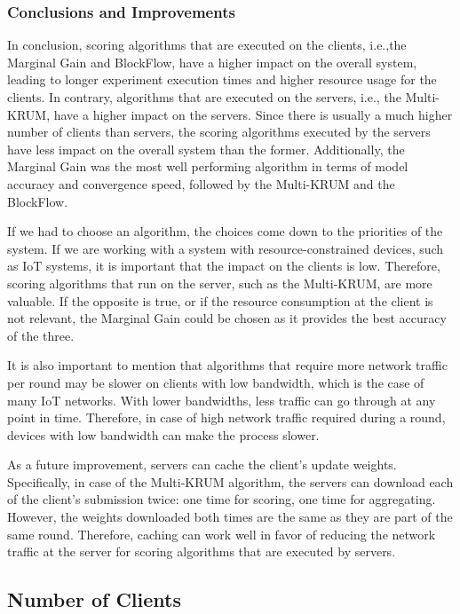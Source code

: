 \subsubsection{Conclusions and Improvements}

In conclusion, scoring algorithms that are executed on the clients, i.e.,the Marginal Gain and BlockFlow, have a higher impact on the overall system, leading to longer experiment execution times and higher resource usage for the clients. In contrary, algorithms that are executed on the servers, i.e., the Multi-KRUM, have a higher impact on the servers. Since there is usually a much higher number of clients than servers, the scoring algorithms executed by the servers have less impact on the overall system than the former. Additionally, the Marginal Gain was the most well performing algorithm in terms of model accuracy and convergence speed, followed by the Multi-KRUM and the BlockFlow.

If we had to choose an algorithm, the choices come down to the priorities of the system. If we are working with a system with resource-constrained devices, such as IoT systems, it is important that the impact on the clients is low. Therefore, scoring algorithms that run on the server, such as the Multi-KRUM, are more valuable. If the opposite is true, or if the resource consumption at the client is not relevant, the Marginal Gain could be chosen as it provides the best accuracy of the three.

It is also important to mention that algorithms that require more network traffic per round may be slower on clients with low bandwidth, which is the case of many IoT networks. With lower bandwidths, less traffic can go through at any point in time. Therefore, in case of high network traffic required during a round, devices with low bandwidth can make the process slower.

As a future improvement, servers can cache the client's update weights. Specifically, in case of the Multi-KRUM algorithm, the servers can download each of the client's submission twice: one time for scoring, one time for aggregating. However, the weights downloaded both times are the same as they are part of the same round. Therefore, caching can work well in favor of reducing the network traffic at the server for scoring algorithms that are executed by servers.

\subsection{Number of Clients}\label{horizontal:number_of_clients}


